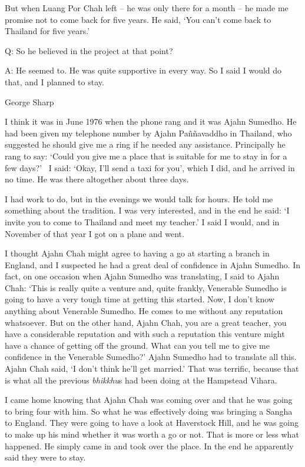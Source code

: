 But when Luang Por Chah left -- he was only there for a month -- he made
me promise not to come back for five years. He said, `You can't come
back to Thailand for five years.'

Q: So he believed in the project at that point? 

A: He seemed to. He was quite supportive in every way. So I said I would
do that, and I planned to stay. 

George Sharp

I think it was in June 1976 when the phone rang and it was Ajahn
Sumedho. He had been given my telephone number by Ajahn Paññavaddho in
Thailand, who suggested he should give me a ring if he needed any
assistance. Principally he rang to say: `Could you give me a place that
is suitable for me to stay in for a few days?'~ I said: `Okay, I'll send
a taxi for you', which I did, and he arrived in no time. He was there
altogether about three days. ~

I had work to do, but in the evenings we would talk for hours. He told
me something about the tradition. I was very interested, and in the end
he said: `I invite you to come to Thailand and meet my teacher.' I said
I would, and in November of that year I got on a plane and went. 

I thought Ajahn Chah might agree to having a go at starting a branch in
England, and I suspected he had a great deal of confidence in Ajahn
Sumedho. In fact, on one occasion when Ajahn Sumedho was translating, I
said to Ajahn Chah: `This is really quite a venture and, quite frankly, 
Venerable Sumedho is going to have a very tough time at getting this
started. Now, I don't know anything about Venerable Sumedho. He comes to
me without any reputation whatsoever. But on the other hand, Ajahn Chah, 
you are a great teacher, you have a considerable reputation and with
such a reputation this venture might have a chance of getting off the
ground. What can you tell me to give me confidence in the Venerable
Sumedho?' Ajahn Sumedho had to translate all this. Ajahn Chah said, `I
don't think he'll get married.' That was terrific, because that is what
all the previous \emph{bhikkhu}s had been doing at the Hampstead Vihara. 

I came home knowing that Ajahn Chah was coming over and that he was
going to bring four with him. So what he was effectively doing was
bringing a Sangha to England. They were going to have a look at
Haverstock Hill, and he was going to make up his mind whether it was
worth a go or not. That is more or less what happened. He simply came in
and took over the place. In the end he apparently said they were to
stay. 

